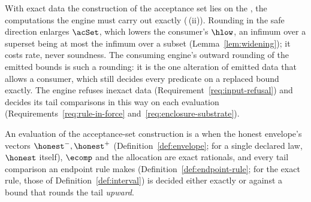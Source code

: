 
With exact data the construction of the acceptance set lies on the
, the computations the engine must carry out exactly
(\,(ii)). Rounding in
the safe direction enlarges $\acSet$, which lowers the consumer's $\hlow$, an
infimum over a superset being at most the infimum over a subset
(Lemma~\ref{lem:widening}); it costs rate, never soundness. The consuming
engine's outward rounding of the emitted bounds is such a rounding: it is the
one alteration of emitted data that
 allows a consumer, which
still decides every predicate on a replaced bound exactly. The engine refuses
inexact data (Requirement~\ref{req:input-refusal}) and decides its tail
comparisons in this way on each evaluation
(Requirements~\ref{req:rule-in-force} and~\ref{req:enclosure-substrate}).

\begin{definition}\label{def:conservative-evaluation}
An evaluation of the acceptance-set construction is a
 when the honest envelope's vectors
${\honest}^{-},{\honest}^{+}$ (Definition~\ref{def:envelope}; for a single
declared law, $\honest$ itself), $\ecomp$ and the allocation are exact
rationals, and every tail comparison an endpoint rule makes
(Definition~\ref{def:endpoint-rule}; for the exact rule, those of
Definition~\ref{def:interval}) is decided either exactly or against a bound
that rounds the tail \emph{upward}.
\end{definition}
